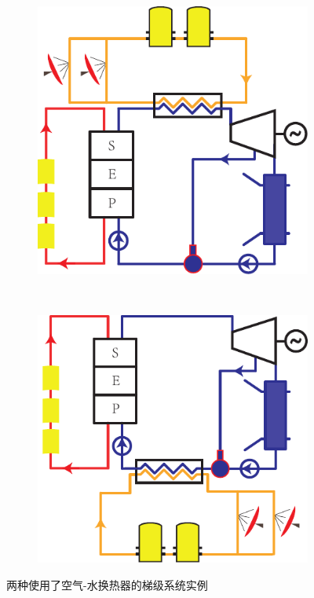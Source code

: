 \noindent \begin{figure}[htbp]
\centering
	\begin{subfigure}[b]{0.4\columnwidth}
	\includegraphics[width = \columnwidth]{fig/air-water1}
	\caption{}\label{fig:air-water_1}
	\end{subfigure}
	~
\begin{subfigure}[b]{0.4\columnwidth}
	\includegraphics[width = \columnwidth]{fig/air-water2}
	\caption{}\label{fig:air-water_2}
	\end{subfigure}
	\caption{两种使用了空气-水换热器的梯级系统实例}
	\label{fig:air-water}
\end{figure}

